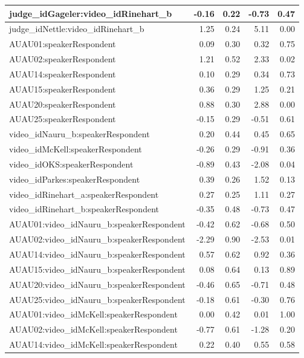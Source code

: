 \documentclass{monashthesis}
\begin{document}
\begin{tabular}{l|r|r|r|r}
\hline
judge\_idGageler:video\_idRinehart\_b & -0.16 & 0.22 & -0.73 & 0.47\\
\hline
judge\_idNettle:video\_idRinehart\_b & 1.25 & 0.24 & 5.11 & 0.00\\
\hline
AUAU01:speakerRespondent & 0.09 & 0.30 & 0.32 & 0.75\\
\hline
AUAU02:speakerRespondent & 1.21 & 0.52 & 2.33 & 0.02\\
\hline
AUAU14:speakerRespondent & 0.10 & 0.29 & 0.34 & 0.73\\
\hline
AUAU15:speakerRespondent & 0.36 & 0.29 & 1.25 & 0.21\\
\hline
AUAU20:speakerRespondent & 0.88 & 0.30 & 2.88 & 0.00\\
\hline
AUAU25:speakerRespondent & -0.15 & 0.29 & -0.51 & 0.61\\
\hline
video\_idNauru\_b:speakerRespondent & 0.20 & 0.44 & 0.45 & 0.65\\
\hline
video\_idMcKell:speakerRespondent & -0.26 & 0.29 & -0.91 & 0.36\\
\hline
video\_idOKS:speakerRespondent & -0.89 & 0.43 & -2.08 & 0.04\\
\hline
video\_idParkes:speakerRespondent & 0.39 & 0.26 & 1.52 & 0.13\\
\hline
video\_idRinehart\_a:speakerRespondent & 0.27 & 0.25 & 1.11 & 0.27\\
\hline
video\_idRinehart\_b:speakerRespondent & -0.35 & 0.48 & -0.73 & 0.47\\
\hline
AUAU01:video\_idNauru\_b:speakerRespondent & -0.42 & 0.62 & -0.68 & 0.50\\
\hline
AUAU02:video\_idNauru\_b:speakerRespondent & -2.29 & 0.90 & -2.53 & 0.01\\
\hline
AUAU14:video\_idNauru\_b:speakerRespondent & 0.57 & 0.62 & 0.92 & 0.36\\
\hline
AUAU15:video\_idNauru\_b:speakerRespondent & 0.08 & 0.64 & 0.13 & 0.89\\
\hline
AUAU20:video\_idNauru\_b:speakerRespondent & -0.46 & 0.65 & -0.71 & 0.48\\
\hline
AUAU25:video\_idNauru\_b:speakerRespondent & -0.18 & 0.61 & -0.30 & 0.76\\
\hline
AUAU01:video\_idMcKell:speakerRespondent & 0.00 & 0.42 & 0.01 & 1.00\\
\hline
AUAU02:video\_idMcKell:speakerRespondent & -0.77 & 0.61 & -1.28 & 0.20\\
\hline
AUAU14:video\_idMcKell:speakerRespondent & 0.22 & 0.40 & 0.55 & 0.58\\

\end{tabular}
\end{document}
